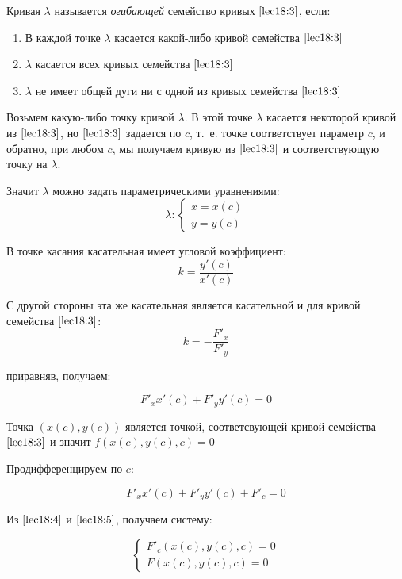 \documentclass[../../main.tex]{subfiles}
\begin{document}
Кривая $\lambda$ называется \emph{ огибающей} семейство кривых 
$\eqref{lec18:3}$, если:

\begin{enumerate}
	\item В каждой точке $\lambda$ касается какой-либо кривой семейства 
	$\eqref{lec18:3}$
	\item $\lambda$ касается всех кривых семейства $\eqref{lec18:3}$
	\item $\lambda$ не имеет общей дуги ни с одной из кривых семейства 
	$\eqref{lec18:3}$
\end{enumerate}

Возьмем какую-либо точку кривой $\lambda$. В этой точке $\lambda$ касается 
некоторой кривой из $\eqref{lec18:3}$, но $\eqref{lec18:3}$ задается по $c$, 
т.~е. точке соответствует параметр $c$, и обратно, при любом $c$, мы получаем 
кривую из $\eqref{lec18:3}$ и соответствующую точку на $\lambda$.

Значит $\lambda$ можно задать параметрическими уравнениями:
\[ \lambda \colon \begin{cases}
x=x\left( c \right) \\
y=y\left( c \right)  
\end{cases} \]

В точке касания касательная имеет угловой коэффициент:
\[ k = \frac{y' \left( c \right) }{ x' \left( c \right) } \]

С другой стороны эта же касательная является касательной и для кривой 
семейства $\eqref{lec18:3} $:
\[ k = - \frac{F'_x}{ F'_y}\] 

приравняв, получаем:

\begin{equation}\label{lec18:4} F'_x x'\left( c \right) + F'_y y'\left( c 
\right) = 0 \end{equation}

Точка $\left( x \left( c\right), y\left( c\right)  \right) $ является точкой, 
соответсвующей кривой семейства $\eqref{lec18:3} $ и значит $f \left( x \left( 
c\right), y\left( c\right), c \right) = 0 $

Продифференцируем по $c$:

\begin{equation}\label{lec18:5} F'_x x'\left( c \right) + F'_y y'\left( c 
\right) + F'_c = 0 \end{equation}

Из $\eqref{lec18:4}$ и $\eqref{lec18:5}$, получаем систему:

\begin{equation}\label{lec18:6} \begin{cases}
F'_c \left( x \left( c\right), y\left( c\right), c \right)  = 0\\
F \left( x \left( c\right), y\left( c\right), c \right)  = 0
\end{cases}  \end{equation}
\end{document}
